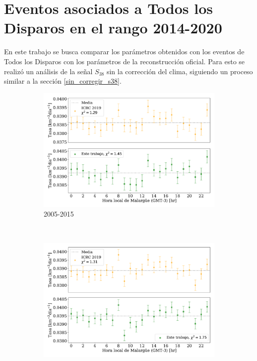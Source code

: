 
\section{Eventos asociados a Todos los Disparos en el rango 2014-2020 }	\label{ALL_modulacion}
	

En este trabajo se busca comparar los parámetros obtenidos con los eventos de Todos los Disparos con los parámetros de la reconstrucción oficial. Para esto se realizó un análisis de la señal $S_{38}$ sin la corrección del clima, siguiendo un proceso similar a la sección \ref{sin_corregir_s38}.

\begin{figure}[H]
  \centering
      \begin{subfigure}[b]{0.75\textwidth}
      \includegraphics[width=\textwidth]{Graphs/rate_hour_of_the_day/2EeV_ICRC_2019_S38_S1000_expected.pdf}
      \caption{2005-2015} \label{fig:2EeV_expected}
      \end{subfigure}\\
      \begin{subfigure}[b]{0.75\textwidth}
      \includegraphics[width=\textwidth]{Graphs/rate_hour_of_the_day/2EeV_ICRC_2019_S38_S1000_expected_05_18.pdf}

\end{subfigure}
\end{figure}
